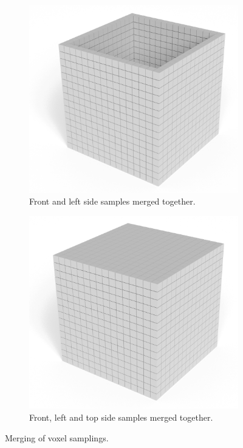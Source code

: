 \begin{figure}[h]
\begin{subfigure}[t]{0.3\textwidth}
        \includegraphics[width=\textwidth]{sections/methodology/figures/voxels-merge-2.png}
        \caption{Front and left side samples merged together.}
        \label{fig:filling-watertight-model}
    \end{subfigure}
    \hfill
    \begin{subfigure}[t]{0.3\textwidth}
        \centering
        \includegraphics[width=\textwidth]{sections/methodology/figures/voxels-merge-3.png}
        \caption{Front, left and top side samples merged together.}
        \label{fig:filling-watertight-model}
    \end{subfigure}
       \caption{Merging of voxel samplings.}
       \label{fig:voxel-sample-merging}
\end{figure}

